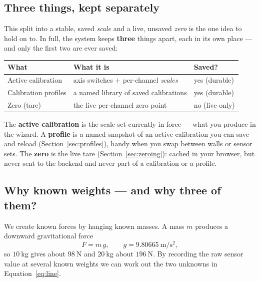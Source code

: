 \documentclass[11pt,a4paper]{article}
\begin{document}
\subsection{Three things, kept separately}
\label{sec:layers}
This split into a stable, saved \emph{scale} and a live, unsaved \emph{zero} is the
one idea to hold on to. In full, the system keeps \textbf{three} things apart, each
in its own place --- and only the first two are ever saved:
\begin{center}
\begin{tabular}{@{}lll@{}}
\toprule
\textbf{What} & \textbf{What it is} & \textbf{Saved?} \\
\midrule
Active calibration & axis switches $+$ per-channel \emph{scales} & yes (durable) \\
Calibration profiles & a named library of saved calibrations & yes (durable) \\
Zero (tare) & the live per-channel zero point & no (live only) \\
\bottomrule
\end{tabular}
\end{center}
The \textbf{active calibration} is the scale set currently in force --- what you
produce in the wizard. A \textbf{profile} is a named snapshot of an active
calibration you can save and reload (Section~\ref{sec:profiles}), handy when you
swap between walls or sensor sets. The \textbf{zero} is the live tare
(Section~\ref{sec:zeroing}): cached in your browser, but never sent to the backend
and never part of a calibration or a profile.

\subsection{Why known weights --- and why three of them?}
We create known forces by hanging known masses. A mass $m$ produces a downward
gravitational force
\begin{equation}
  F = m\,g, \qquad g = 9.80665~\mathrm{m/s^2},
\end{equation}
so $10~\mathrm{kg}$ gives about $98~\mathrm{N}$ and $20~\mathrm{kg}$ about
$196~\mathrm{N}$. By recording the raw sensor value at several known weights we can
work out the two unknowns in Equation~\eqref{eq:line}.
\end{document}
